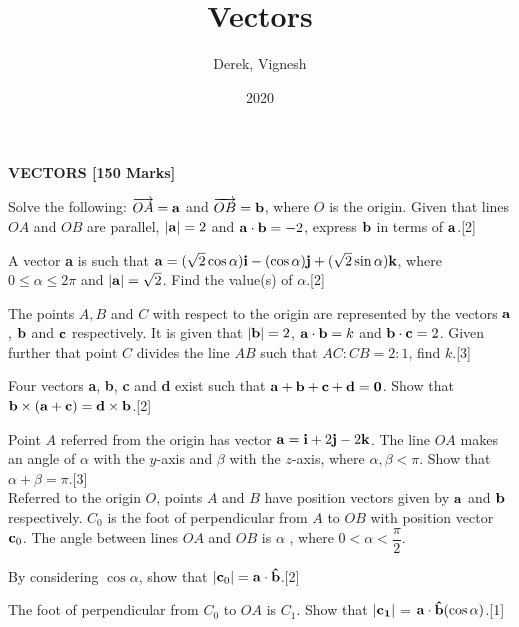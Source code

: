 \documentclass[12pt, a4 paper]{article}
\title{Vectors}
\author{Derek, Vignesh}
\date{2020}
\begin{document}
\maketitle
\textbf{VECTORS [150 Marks]}
\begin{outline}[enumerate]
	\1 Solve the following:
	\2 $\overrightarrow {OA}  = {\bf{a}}$ and $\overrightarrow {OB}  = {\bf{b}}$, where $O$ is the origin. Given that lines $OA$ and $OB$ are parallel, $\left| {\bf{a}} \right| = 2$ and ${\bf{a}} \cdot {\bf{b}} =  - 2$, express $\bf{b}$ in terms of $\bf{a}$.\hfill[2]
	
	\2 A vector \textbf{a} is such that ${\bf{a}} = (\sqrt 2 \cos \alpha ){\bf{i}} - (\cos \alpha ){\bf{j}} + (\sqrt 2 \sin \alpha ){\bf{k}}$, where $0 \le \alpha  \le 2\pi $ and $\left| {\bf{a}} \right| = \sqrt 2 $. Find the value(s) of $\alpha $.\hfill[2]
	
	\2 The points $A, B$ and $C$ with respect to the origin are represented by the vectors ${\bf{a}}$, ${\bf{b}}$ and ${\bf{c}}$ respectively. It is given that $\left| {\bf{b}} \right| = 2$, ${\bf{a}} \cdot {\bf{b}} = k$ and ${\bf{b}} \cdot {\bf{c}} = 2$. Given further that point $C$ divides the line $AB$ such that $AC:CB = 2:1$, find $k$.\hfill[3]
	
	\2 Four vectors \textbf{a}, \textbf{b}, \textbf{c} and \textbf{d} exist such that ${\bf{a}} + {\bf{b}} + {\bf{c}} + {\bf{d}} = {\bf{0}}$. Show that ${\bf{b}} \times ({\bf{a}} + {\bf{c}}) = {\bf{d}} \times {\bf{b}}$.\hfill[2]
	
	\2 Point $A$ referred from the origin has vector ${\bf{a}} = {\bf{i}} + 2{\bf{j}} - 2{\bf{k}}$. The line $OA$ makes an angle of $\alpha $ with the $y$-axis and $\beta $ with the $z$-axis, where $\alpha ,\beta  < \pi $. Show that $\alpha  + \beta  = \pi $.\hfill[3]\\
		
	\1 Referred to the origin $O$, points $A$ and $B$ have position vectors given by ${\bf{a}}$ and ${\bf{b}}$ respectively. ${C_0}$ is the foot of perpendicular from $A$ to $OB$ with position vector ${{\bf{c}}_0}$. The angle between lines $OA$ and $OB$ is $\alpha$ , where $ 0< \alpha  < \dfrac{\pi}{2}$.
							    
	\2 By considering $\cos{\alpha}$, show that $|{\bf{c}}_0|= {\bf{a}} \cdot {\bf{\hat b}}$.\hfill[2]
	
	\2 The foot of perpendicular from ${C_0}$ to $OA$ is ${C_1}$. Show that $|\bf{c}_1|$ = ${\bf{a}} \cdot {\bf{\hat b}}(\cos \alpha )$.\hfill[1]\\
		

\end{outline}
\end{document}
